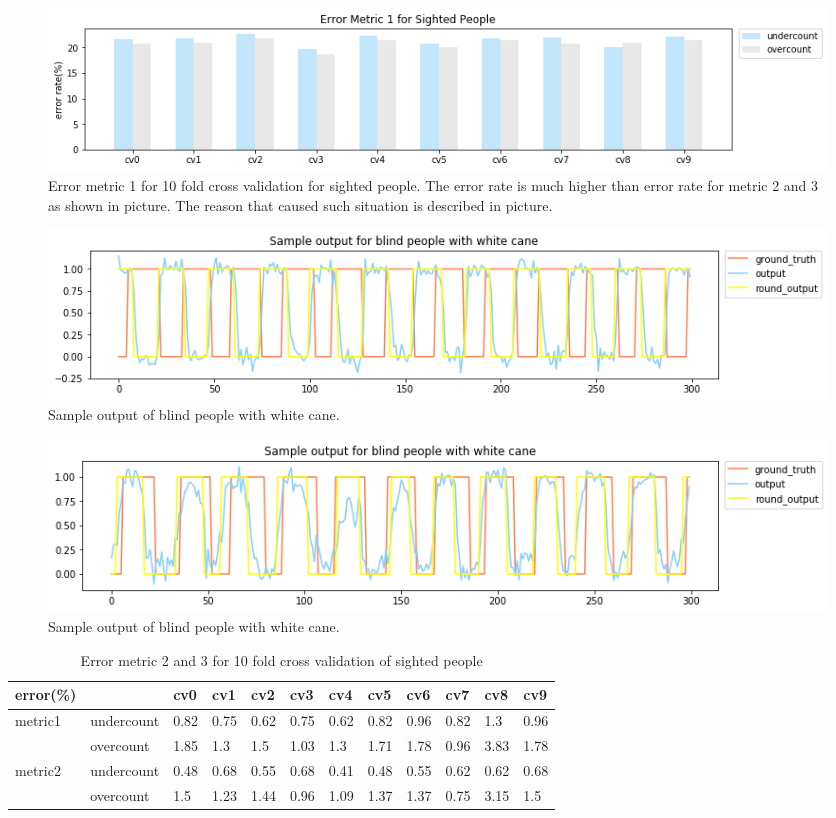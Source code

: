 \documentclass[11pt]{article}
\begin{document}
{\begin{figure}[ht]
\centering
\includegraphics[scale=0.5]{error_metric_1_na_10fold}
\caption{Error metric 1 for 10 fold cross validation for sighted people. The error rate is much higher than error rate for metric 2 and 3 as shown in picture. The reason that caused such situation is described in picture.}
\label{fig:error_metric_1_na_10fold}
\end{figure}


\begin{figure}[ht]
\centering
\includegraphics[scale=0.5]{output_wc_1}
\caption{Sample output of blind people with white cane.}
\label{fig:output_wc_1}
\end{figure}

\begin{figure}[ht]
\centering
\includegraphics[scale=0.5]{output_wc_2}
\caption{Sample output of blind people with white cane.}
\label{fig:output_wc_2}
\end{figure}




\begin{table}[]
\centering
\caption{Error metric 2 and 3 for 10 fold cross validation of sighted people}
\label{label_metric23_sighted}
\begin{tabular}{llllllllllll}
\hline
error(\%)                &            & cv0   & cv1   & cv2   & cv3   & cv4   & cv5   & cv6   & cv7   & cv8   & cv9  \\ \hline
metric1                  & undercount & 0.82  & 0.75  & 0.62  & 0.75  & 0.62  & 0.82  & 0.96  & 0.82  & 1.3   & 0.96 \\
                         & overcount  & 1.85  & 1.3   & 1.5   & 1.03  & 1.3   & 1.71  & 1.78  & 0.96  & 3.83  & 1.78 \\ \hline
\multirow{2}{*}{metric2} & undercount & 0.48  & 0.68  & 0.55  & 0.68  & 0.41  & 0.48  & 0.55  & 0.62  & 0.62  & 0.68 \\
                         & overcount  & 1.5   & 1.23  & 1.44  & 0.96  & 1.09  & 1.37  & 1.37  & 0.75  & 3.15  & 1.5  \\ \hline
\end{tabular}
\end{table}


}
\end{document}
